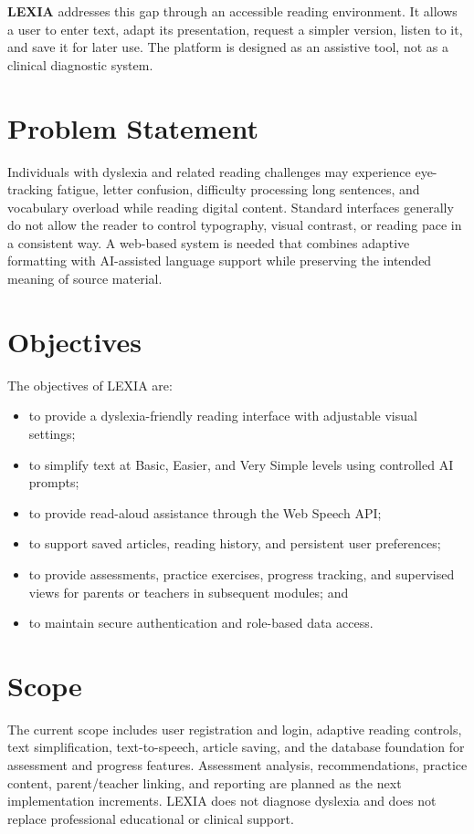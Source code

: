 \documentclass[a4paper]{tietreport}
\newcommand{\Lexia}{\textbf{LEXIA}}
\begin{document}
\Lexia{} addresses this gap through an accessible reading environment. It allows a user to enter text, adapt its presentation, request a simpler version, listen to it, and save it for later use. The platform is designed as an assistive tool, not as a clinical diagnostic system.

\section{Problem Statement}
Individuals with dyslexia and related reading challenges may experience eye-tracking fatigue, letter confusion, difficulty processing long sentences, and vocabulary overload while reading digital content. Standard interfaces generally do not allow the reader to control typography, visual contrast, or reading pace in a consistent way. A web-based system is needed that combines adaptive formatting with AI-assisted language support while preserving the intended meaning of source material.

\section{Objectives}
The objectives of LEXIA are:
\begin{itemize}
  \item to provide a dyslexia-friendly reading interface with adjustable visual settings;
  \item to simplify text at Basic, Easier, and Very Simple levels using controlled AI prompts;
  \item to provide read-aloud assistance through the Web Speech API;
  \item to support saved articles, reading history, and persistent user preferences;
  \item to provide assessments, practice exercises, progress tracking, and supervised views for parents or teachers in subsequent modules; and
  \item to maintain secure authentication and role-based data access.
\end{itemize}

\section{Scope}
The current scope includes user registration and login, adaptive reading controls, text simplification, text-to-speech, article saving, and the database foundation for assessment and progress features. Assessment analysis, recommendations, practice content, parent/teacher linking, and reporting are planned as the next implementation increments. LEXIA does not diagnose dyslexia and does not replace professional educational or clinical support.
\end{document}
